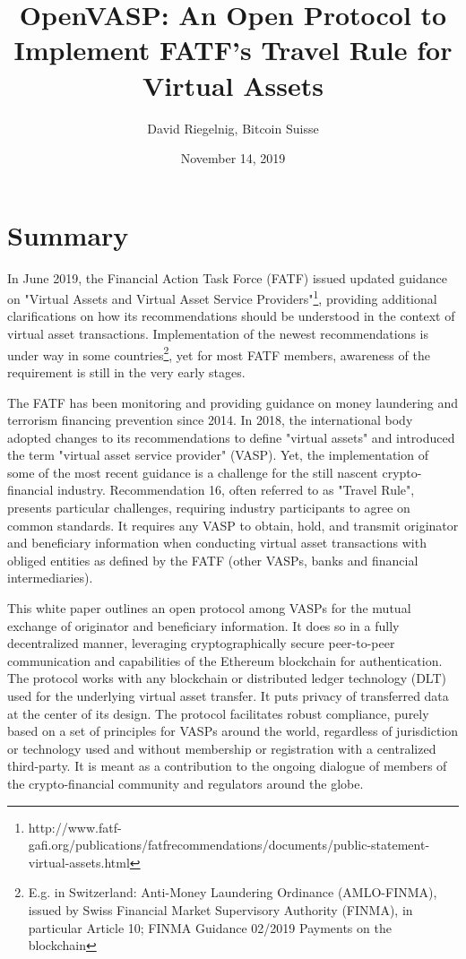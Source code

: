 \documentclass{article}
\title{OpenVASP: An Open Protocol to Implement FATF's
Travel Rule for Virtual Assets}
\author{David Riegelnig, Bitcoin Suisse}
\date{November 14, 2019}
\begin{document}
\maketitle

\section*{Summary}
In June 2019, the Financial Action Task Force (FATF) issued updated guidance on "Virtual Assets and Virtual Asset Service Providers"\footnote{ http://www.fatf-gafi.org/publications/fatfrecommendations/documents/public-statement-virtual-assets.html}, providing additional clarifications on how its recommendations should be understood in the context of virtual asset transactions. Implementation of the newest recommendations is under way in some countries\footnote{E.g. in Switzerland: Anti-Money Laundering Ordinance (AMLO-FINMA), issued by Swiss Financial Market Supervisory Authority (FINMA), in particular Article 10; FINMA Guidance 02/2019 Payments on the blockchain}, yet for most FATF members, awareness of the requirement is still in the very early stages.

The FATF has been monitoring and providing guidance on money laundering and terrorism financing prevention since 2014. In 2018, the international body adopted changes to its recommendations to define "virtual assets" and introduced the term "virtual asset service provider" (VASP). Yet, the implementation of some of the most recent guidance is a challenge for the still nascent crypto-financial industry. Recommendation 16, often referred to as "Travel Rule", presents particular challenges, requiring industry participants to agree on common standards. It requires any VASP to obtain, hold, and transmit originator and beneficiary information when conducting virtual asset transactions with obliged entities as defined by the FATF (other VASPs, banks and financial intermediaries).

This white paper outlines an open protocol among VASPs for the mutual exchange of originator and beneficiary information. It does so in a fully decentralized manner, leveraging cryptographically secure peer-to-peer communication and capabilities of the Ethereum blockchain for authentication. The protocol works with any blockchain or distributed ledger technology (DLT) used for the underlying virtual asset transfer. It puts privacy of transferred data at the center of its design.
The protocol facilitates robust compliance, purely based on a set of principles for VASPs around the world, regardless of jurisdiction or technology used and without membership or registration with a centralized third-party. It is meant as a contribution to the ongoing dialogue of members of the crypto-financial community and regulators around the globe.
\end{document}
